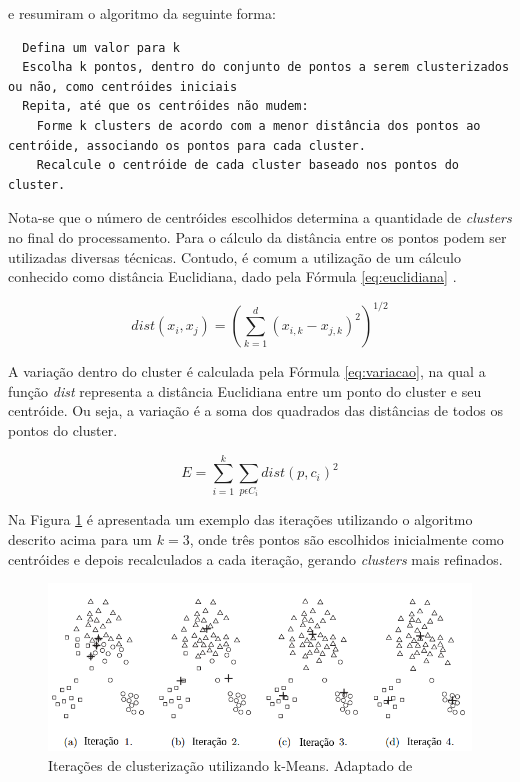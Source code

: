 e  resumiram o algoritmo da seguinte forma:


\begin{center}
  \lstset{language=HTML, numbers=left, stepnumber=1}
  \begin{lstlisting}
  Defina um valor para k
  Escolha k pontos, dentro do conjunto de pontos a serem clusterizados ou não, como centróides iniciais
  Repita, até que os centróides não mudem:
    Forme k clusters de acordo com a menor distância dos pontos ao centróide, associando os pontos para cada cluster.
    Recalcule o centróide de cada cluster baseado nos pontos do cluster.
  \end{lstlisting}
\end{center}


Nota-se que o número de centróides escolhidos determina a quantidade de \textit{clusters} no final do processamento.
Para o cálculo da distância entre os pontos podem ser utilizadas diversas técnicas. Contudo, é comum a utilização de 
um cálculo conhecido como distância Euclidiana, 
dado pela Fórmula \ref{eq:euclidiana} \cite{clustering_review, tan2013data, han2011data}.

\begin{equation} \label{eq:euclidiana}
  dist(x_i, x_j) = (\sum_{k=1}^{d} (x_{i,k} - x_{j,k})^2)^{1/2}
\end{equation}

A variação dentro do cluster é calculada pela Fórmula \ref{eq:variacao}, na qual a 
função \textit{dist} representa a distância Euclidiana entre um ponto do
cluster e seu centróide. Ou seja, a variação é a soma dos quadrados
das distâncias de todos os pontos do cluster.

\begin{equation} \label{eq:variacao}
  E = \sum_{i=1}^{k} \sum_{p \epsilon C_{i}} dist(p, c_i)^2
\end{equation}

Na Figura \ref{fig:iteracoes_kmeans} é apresentada um exemplo das iterações utilizando o algoritmo descrito acima para um $k = 3$,
onde três pontos são escolhidos inicialmente como centróides e depois recalculados a cada iteração, gerando \textit{clusters} mais
refinados.

\begin{figure}[h!]
\centering
\includegraphics[scale=0.6]{figuras/iteracoes_kmeans.png}
\caption{Iterações de clusterização utilizando k-Means. Adaptado de }
\label{fig:iteracoes_kmeans}
\end{figure}

